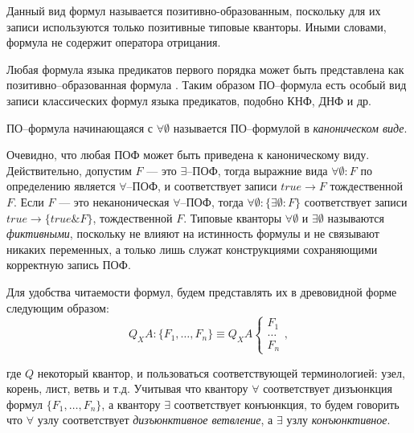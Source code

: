 Данный вид формул называется позитивно-образованным, поскольку для их записи используются только позитивные типовые кванторы. Иными словами, формула не содержит оператора отрицания.

Любая формула языка предикатов первого порядка может быть представлена как позитивно--образованная формула \cite{ICDS2000}. Таким образом ПО--формула есть особый вид записи классических формул языка предикатов, подобно КНФ, ДНФ и др.

ПО--формула начинающаяся с $\forall \emptyset$ называется ПО--формулой в {\em каноническом виде}.


Очевидно, что любая ПОФ может быть приведена к каноническому виду. Действительно, допустим $F$ --- это $\exists$--ПОФ, тогда выражние вида
$\forall \emptyset\colon F$ по определению является $\forall$--ПОФ, и соответствует записи $true \rightarrow F$ тождественной $F$. Если $F$ --- это неканоническая $\forall$--ПОФ, тогда $\forall \emptyset\colon\{\exists \emptyset\colon F\}$ соответствует записи $true \rightarrow \{true\&F\}$, тождественной $F$. Типовые кванторы $\forall \emptyset$ и $\exists \emptyset$ называются {\em фиктивными}, поскольку не влияют на истинность формулы и не связывают никаких переменных, а только лишь служат конструкциями сохраняющими корректную запись ПОФ.

Для удобства читаемости формул, будем представлять их в древовидной форме следующим образом:
$$Q_XA\colon\{F_1,\ldots,F_n\} \equiv Q_XA \left\{
\begin{array}{lcl}
 F_1 \\
 \ldots \\
 F_n
\end{array}
\right.,$$

где $Q$ некоторый квантор, и пользоваться соответствующей терминологией: узел, корень, лист, ветвь и т.д. Учитывая что квантору $\forall$ соответствует дизъюнкция формул $\{F_1,\ldots,F_n\}$, а квантору $\exists$ соответствует конъюнкция, то будем говорить что $\forall$ узлу соответствует {\em дизъюнктивное ветвление}, а $\exists$ узлу {\em конъюнктивное}.

